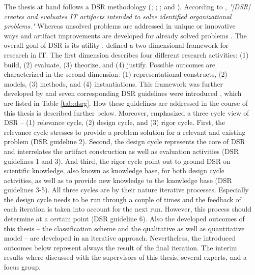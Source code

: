 The thesis at hand follows a \ac{DSR} methodology (\citealp{March1995}; \citealp{Hevner2004}; \citealp{Hevner2007}; and \citealp{Peffers2007}). According to \citet[p. 77]{Hevner2004}, \textit{"[\ac{DSR}] creates and evaluates IT artifacts intended to solve identified organizational problems."} Whereas unsolved problems are addressed in unique or innovative ways and artifact improvements are developed for already solved problems \citep[p. 81]{Hevner2004}. The overall goal of \ac{DSR} is its utility \citep[p. 80]{Hevner2004}.
\citet[pp. 255-262]{March1995} defined a two dimensional framework for research in IT. The first dimension describes four different research activities: (1) build, (2) evaluate, (3) theorize, and (4) justify. Possible outcomes are characterized in the second dimension: (1) representational constructs, (2) models, (3) methods, and (4) instantiations. This framework was further developed by \citet[pp. 78-81]{Hevner2004} and seven corresponding \ac{DSR} guidelines were introduced \citep[pp. 82-90]{Hevner2004}, which are listed in Table \ref{tab:dsrg}. How these guidelines are addressed in the course of this thesis is described further below. Moreover, \citet[pp. 87-92]{Hevner2007} emphasized a three cycle view of \ac{DSR} -- (1) relevance cycle, (2) design cycle, and (3) rigor cycle. First, the relevance cycle stresses to provide a problem solution for a relevant and existing problem (\ac{DSR} guideline 2). Second, the design cycle represents the core of \ac{DSR} and interrelates the artifact construction as well as evaluation activities (\ac{DSR} guidelines 1 and 3). And third, the rigor cycle point out to ground \ac{DSR} on scientific knowledge, also known as knowledge base, for both design cycle activities, as well as to provide new knowledge to the knowledge base (\ac{DSR} guidelines 3-5). All three cycles are by their nature iterative processes. Especially the design cycle needs to be run through a couple of times and the feedback of each iteration is taken into account for the next run. However, this process should determine at a certain point (\ac{DSR} guideline 6). Also the developed outcomes of this thesis -- the classification scheme and the qualitative as well as quantitative model -- are developed in an iterative approach. Nevertheless, the introduced outcomes below represent always the result of the final iteration. The interim results where discussed with the supervisors of this thesis, several experts, and a focus group.

